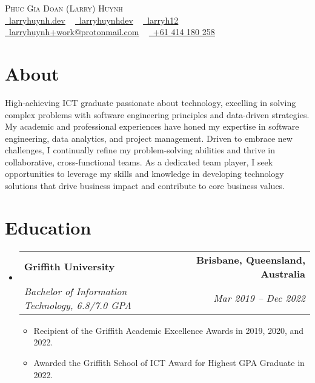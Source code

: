 \documentclass[letterpaper,11pt]{article}
\makeatletter
\newcommand{\resumeItem}[1]{
  \item\small{
    {#1 \vspace{-3pt}}
  }
}
\newcommand{\resumeSubheading}[4]{
  \vspace{-3pt}\item
    \begin{tabular*}{1.0\textwidth}[t]{l@{\extracolsep{\fill}}r}
      \textbf{#1} & \textbf{\small #2} \\
      \textit{\small#3} & \textit{\small #4} \\
    \end{tabular*}\vspace{-7pt}
}
\newcommand{\resumeSubHeadingListStart}{\begin{itemize}[leftmargin=0.0in, label={}]}
\newcommand{\resumeSubHeadingListEnd}{\end{itemize}}
\newcommand{\resumeItemListStart}{\begin{itemize}}
\newcommand{\resumeItemListEnd}{\end{itemize}\vspace{0pt}}
\makeatother
\begin{document}
\begin{center}
  {\Huge\scshape Phuc Gia Doan (Larry) Huynh}\\
  \vspace{3pt}
  \small{
    \href{https://www.larryhuynh.dev}{\raisebox{-0.2\height}\faGlobe\ \underline{larryhuynh.dev}}  ~
    \href{https://www.linkedin.com/in/larryhuynhdev}{\raisebox{-0.2\height}\faLinkedin\ \underline{larryhuynhdev}}  ~
    \href{https://github.com/larryh12}{\raisebox{-0.2\height}\faGithub\ \underline{larryh12}} ~
    \href{mailto:larryhuynh+work@protonmail.com}{\raisebox{-0.2\height}\faEnvelope\  \underline{larryhuynh+work@protonmail.com}} ~
    \href{tel:+61414180258}{\raisebox{-0.2\height}\faPhone\  \underline{+61 414 180 258}}}
\end{center}
\vspace{-7pt}


\section{About}
  \small{High-achieving ICT graduate passionate about technology, excelling in solving complex problems with software engineering principles and data-driven strategies. My academic and professional experiences have honed my expertise in software engineering, data analytics, and project management. Driven to embrace new challenges, I continually refine my problem-solving abilities and thrive in collaborative, cross-functional teams. As a dedicated team player, I seek opportunities to leverage my skills and knowledge in developing technology solutions that drive business impact and contribute to core business values.}


\section{Education}
  \resumeSubHeadingListStart
    \resumeSubheading
    {Griffith University}{Brisbane, Queensland, Australia}
    {Bachelor of Information Technology, 6.8/7.0 GPA}{Mar 2019 -- Dec 2022}
        \resumeItemListStart
            \resumeItem{Recipient of the Griffith Academic Excellence Awards in 2019, 2020, and 2022.}
            \resumeItem{Awarded the Griffith School of ICT Award for Highest GPA Graduate in 2022.}
        \resumeItemListEnd
  \resumeSubHeadingListEnd


\end{document}
